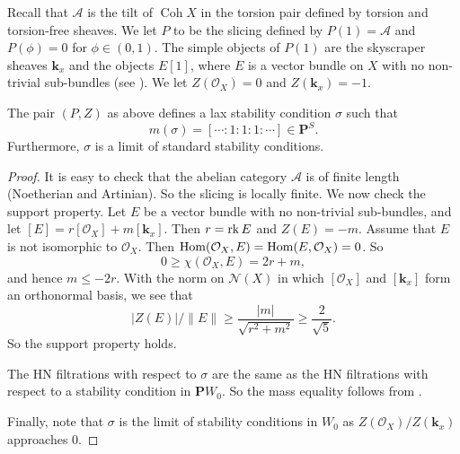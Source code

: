 \documentclass{amsart}
\begin{document}
Recall that \(\mathcal{A}\) is the tilt of \(\operatorname{Coh} X\) in the torsion pair defined by torsion and torsion-free sheaves.
We let \(P\) to be the slicing defined by \(P(1) = \mathcal{A}\) and \(P(\phi) = 0\) for \(\phi \in (0,1)\).
The simple objects of \(P(1)\) are the skyscraper sheaves \(\mathbf{k}_x\) and the objects \(E[1]\), where \(E\) is a vector bundle on \(X\) with no non-trivial sub-bundles (see \cite[Remark~4.3 (iii)]{huy.mac.ste:08}).
We let \(Z(\mathcal{O}_X) = 0\) and \(Z(\mathbf{k}_x) = -1\).
\begin{proposition}\label{prop:red}
  The pair \((P,Z)\) as above defines a lax stability condition \(\sigma\) such that \[m(\sigma) = [\cdots : 1 : 1: 1 : \cdots] \in \mathbf{P}^S.\]
  Furthermore, \(\sigma\) is a limit of standard stability conditions.
\end{proposition}
\begin{proof}
  It is easy to check that the abelian category \(\mathcal{A}\) is of finite length (Noetherian and Artinian).
  So the slicing is locally finite.
  We now check the support property.
  Let \(E\) be a vector bundle with no non-trivial sub-bundles, and let \([E] = r[\mathcal{O}_X] + m[\mathbf{k}_x]\).
  Then \(r = \operatorname{rk} E\) and \(Z(E) = -m\).
  Assume that \(E\) is not isomorphic to \(\mathcal{O}_X\).
  Then \(\operatorname{Hom}(\mathcal{O}_X, E) = \operatorname{Hom}(E, \mathcal{O}_X) = 0\).
  So \[0 \geq \chi(\mathcal{O}_X, E) = 2r+m,\]
  and hence \(m \leq -2r\).
  With the norm on \(\mathcal{N}(X)\) in which \([\mathcal{O}_X]\) and \([\mathbf{k}_x]\) form an orthonormal basis, we see that \[|Z(E)|/\|E\| \geq \frac{|m|}{\sqrt{r^2+m^2}} \geq \frac{2}{\sqrt 5}.\]
  So the support property holds.

  The HN filtrations with respect to \(\sigma\) are the same as the HN filtrations with respect to a stability condition in \(\mathbf{P}W_0\).
  So the mass equality follows from .

  Finally, note that \(\sigma\) is the limit of stability conditions in \(W_0\) as \(Z(\mathcal{O}_{X})/Z(\mathbf{k}_x)\) approaches \(0\).
\end{proof}
\end{document}
